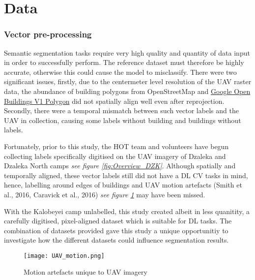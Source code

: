 \documentclass[11pt, a4paper, twoside]{report}
\begin{document}
\section{Data}\label{Data}

\subsubsection{Vector pre-processing}

Semantic segmentation tasks require very high quality and quantity of data input in order to successfully perform. The reference dataset must therefore be highly accurate, otherwise this could cause the model to misclassify. There were two significant issues, firstly, due to the centermeter level resolution of the UAV raster data, the abundance of building polygons from OpenStreetMap and \href{https://developers.google.com/earth-engine/datasets/catalog/GOOGLE_Research_open-buildings_v1_polygons}{Google Open Buildings V1 Polygon} did not spatially align well even after reprojection. Secondly, there were a temporal mismatch between such vector labels and the UAV in collection, causing some labels without building and buildings without labels.\\\par

Fortunately, prior to this study, the HOT team and volunteers have begun collecting labels specifically digitised on the UAV imagery of Dzaleka and Dzaleka North camps \textit{see figure \ref{fig:Overview_DZK}}. Although spatially and temporally aligned, these vector labels still did not have a DL CV tasks in mind, hence, labelling around edges of buildings and UAV motion artefacts (Smith et al., 2016, Caravick et al., 2016) \textit{see figure \ref{fig:UAV_motion}} may have been missed.\\\par

With the Kalobeyei camp unlabelled, this study created albeit in less quanitity, a carefully digitised, pixel-aligned dataset which is suitable for DL tasks. The combination of datasets provided gave this study a unique opportunitiy to investigate how the different datasets could influence segmentation results.\\\par

\begin{figure}[H]
  \centering
  \texttt{[image: UAV\_motion.png]}
  \caption{Motion artefacts unique to UAV imagery}
  \label{fig:UAV_motion}
\end{figure}
\end{document}
